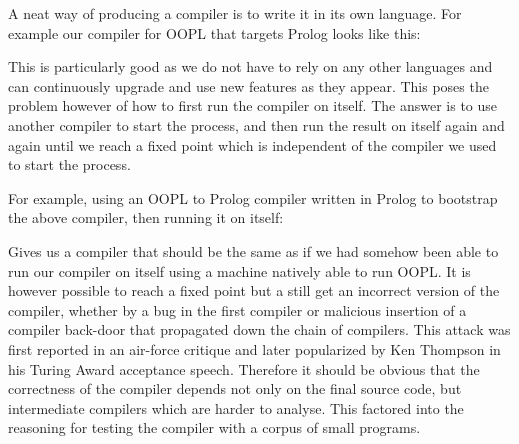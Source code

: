 \documentclass[12pt,a4paper,twoside,openright]{report}
\newcommand{\tblocktext}[3]{
    {#1} \& $\to$   \& {#2} \\
    {}     \&  {#3}   \&      \\
}
\newcommand{\tblockoutline}[1]{
    \draw (#1-1-1.south west) |- (#1-1-3.north east) |- (#1-1-3.south west) |- (#1-2-2.south west) |- (#1-1-1.south west);
}
\newcommand{\wblocktext}[1]{
    {#1} \\
    {}\\
}
\newcommand{\wblockoutline}[1]{
    \draw (#1-1-1.south west) |- (#1-1-1.north east) -- (#1-1-1.south east) -- (#1-2-1.south) -- (#1-1-1.south west);
}
\newcommand{\wsupt}[2]{
	\node(mac#2) at (#2-2-2.south west) [wblock, anchor = mac#2-1-1.north west] {\wblocktext{#1}};
	\wblockoutline{mac#2};
}
\begin{document}
A neat way of producing a compiler is to write it in its own language. For example our compiler for OOPL that targets Prolog looks like this:

\begin{center}
\end{center}

This is particularly good as we do not have to rely on any other languages and can continuously upgrade and use new features as they appear. This poses the problem however of how to first run the compiler on itself. The answer is to use another compiler to start the process, and then run the result on itself again and again until we reach a fixed point which is independent of the compiler we used to start the process.

 \bigskip
 
For example, using an OOPL to Prolog compiler written in Prolog to bootstrap the above compiler, then running it on itself:

\begin{center}
\end{center}

Gives us a compiler that should be the same as if we had somehow been able to run our compiler on itself using a machine natively able to run OOPL. It is however possible to reach a fixed point but a still get an incorrect version of the compiler, whether by a bug in the first compiler or malicious insertion of a compiler back-door that propagated down the chain of compilers. This attack was first reported in an air-force critique\cite{MULTICS} and later popularized by Ken Thompson in his Turing Award acceptance speech\cite{KEN}. Therefore it should be obvious that the correctness of the compiler depends not only on the final source code, but intermediate compilers which are harder to analyse. This factored into the reasoning for testing the compiler with a corpus of small programs.
\end{document}
